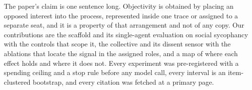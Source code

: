 The paper's claim is one sentence long. Objectivity is obtained by placing
an opposed interest into the process, represented inside one trace or
assigned to a separate seat, and it is a property of that arrangement and
not of any copy. Our contributions are the scaffold and its single-agent
evaluation on social sycophancy with the controls that scope it, the
collective and its dissent sensor with the ablations that locate the
signal in the assigned roles, and a map of where each effect holds and
where it does not. Every experiment was pre-registered with a spending
ceiling and a stop rule before any model call, every interval is an
item-clustered bootstrap, and every citation was fetched at a primary
page.
